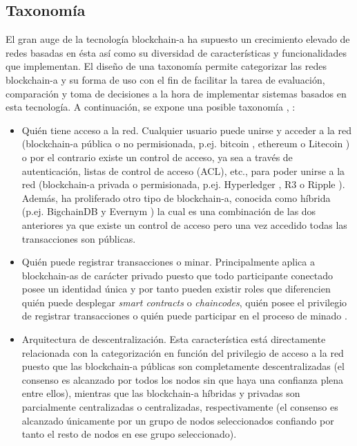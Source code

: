 \documentclass[12pt,a4paper, twoside]{report}
\begin{document}
	\subsection{Taxonomía}
	
	El gran auge de la tecnología \gls{blockchain-a} ha supuesto un crecimiento elevado de redes basadas en ésta así como su diversidad de características y funcionalidades que implementan. El diseño de una taxonomía permite categorizar las redes \gls{blockchain-a} y su forma de uso con el fin de facilitar la tarea de evaluación, comparación y toma de decisiones a la hora de implementar sistemas basados en esta tecnología. A continuación, se expone una posible taxonomía  \cite{xiwei:2017:taxonomy}, \cite{zheng:2017:taxonomy}:
	
	\begin{itemize}
		\item Quién tiene acceso a la red. Cualquier usuario puede unirse y acceder a la red (\gls{blockchain-a} pública o no permisionada, p.ej. \gls{bitcoin} \cite{bitcoin}, \gls{ethereum} \cite{ethereum} o Litecoin \cite{litecoin}) o por el contrario existe un control de acceso, ya sea a través de autenticación, listas de control de acceso (ACL), etc., para poder unirse a la red (\gls{blockchain-a} privada o permisionada, p.ej. Hyperledger \cite{hyperledger:url}, R3 \cite{r3} o Ripple \cite{ripple}). Además, ha proliferado otro tipo de \gls{blockchain-a}, conocida como híbrida (p.ej. BigchainDB \cite{bigchaindb} y Evernym \cite{evernym}) la cual es una combinación de las dos anteriores ya que existe un control de acceso pero una vez accedido todas las transacciones son públicas.
		
		\item Quién puede registrar transacciones o minar. Principalmente aplica a \glspl{blockchain-a} de carácter privado puesto que todo participante conectado posee un identidad única y por tanto pueden existir roles que diferencien quién puede desplegar \textit{smart contracts} o \textit{\glspl{chaincode}}, quién posee el privilegio de registrar transacciones \cite{hyperledgercomposer:acl} o quién puede participar en el proceso de minado \cite{multichain:permissions}.
		
		\item Arquitectura de descentralización. Esta característica está directamente relacionada con la categorización en función del privilegio de acceso a la red puesto que las \gls{blockchain-a} públicas son completamente descentralizadas (el consenso es alcanzado por todos los nodos sin que haya una confianza plena entre ellos), mientras que las \gls{blockchain-a} híbridas y privadas son parcialmente centralizadas o centralizadas, respectivamente (el consenso es alcanzado únicamente por un grupo de nodos seleccionados confiando por tanto el resto de nodos en ese grupo seleccionado).
		

\end{itemize}
\end{document}
